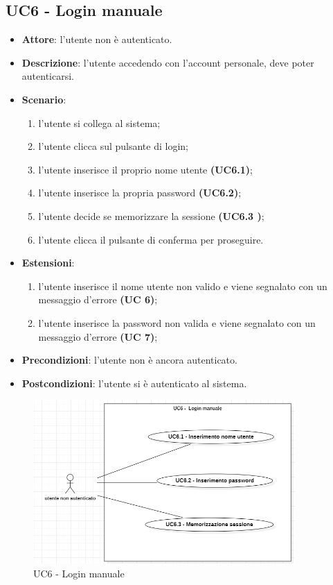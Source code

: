 \subsection{UC6 - Login manuale}

\begin{itemize}
    \item \textbf{Attore}: l'utente non è autenticato.
    \item \textbf{Descrizione}: l'utente accedendo con l'account personale, deve poter autenticarsi.
    \item \textbf{Scenario}:
    \begin{enumerate}
        \item l'utente si collega al sistema;
        \item l'utente clicca sul pulsante di login;
        \item l'utente inserisce il proprio nome utente \textbf{(UC6.1)};
        \item l'utente inserisce la propria password \textbf{(UC6.2)};
        \item l'utente decide se memorizzare la sessione \textbf{(UC6.3 )};
        \item l'utente clicca il pulsante di conferma per proseguire.
    \end{enumerate}
    \item \textbf{Estensioni}:
        \begin{enumerate}
            \item l'utente inserisce il nome utente non valido e viene segnalato con un messaggio d'errore \textbf{(UC 6)};
            \item l'utente inserisce la password non valida e viene segnalato con un messaggio d'errore \textbf{(UC 7)};
        \end{enumerate}

    \item \textbf{Precondizioni}: l'utente non è ancora autenticato.
    \item \textbf{Postcondizioni}: l'utente si è autenticato al sistema.
\end{itemize}

\begin{figure}[!h]
    \includegraphics[width=10cm]{sezioni/Images/UC6-Manuale.png}
    \centering
    \caption{UC6 - Login manuale}
\end{figure}

